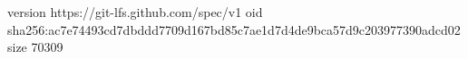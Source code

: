 version https://git-lfs.github.com/spec/v1
oid sha256:ac7e74493cd7dbddd7709d167bd85c7ae1d7d4de9bca57d9c203977390adcd02
size 70309
